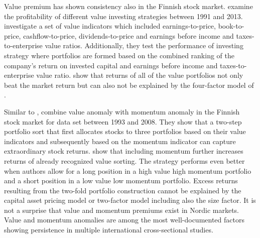 \documentclass[12pt]{article}
\begin{document}
Value premium has shown consistency also in the Finnish stock market. \citet*{Davydov2017MagicFV} examine the profitability of different value investing strategies between 1991 and 2013. \citeauthor{Davydov2017MagicFV} investigate a set of value indicators which included earnings-to-price, book-to-price, cashflow-to-price, dividends-to-price and earnings before income and taxes-to-enterprise value ratios. Additionally, they test the performance of investing strategy where portfolios are formed based on the combined ranking of the company's return on invested capital and earnings before income and taxes-to-enterprise value ratio. \citet{Davydov2017MagicFV} show that returns of all of the value portfolios not only beat the market return but can also not be explained by the four-factor model of \citet{Carhart1997}.\footnotemark {}  \par


Similar to \citet{grobys}, \citet{leivo2011} combine value anomaly with momentum anomaly in the Finnish stock market for data set between 1993 and 2008. They show that a two-step portfolio sort that first allocates stocks to three portfolios based on their value indicators and subsequently based on the momentum indicator can capture extraordinary stock returns. \citeauthor{leivo2011} show that including momentum further increases returns of already recognized value sorting. The strategy performs even better when authors allow for a long position in a high value high momentum portfolio and a short position in a low value low momentum portfolio. Excess returns resulting from the two-fold portfolio construction cannot be explained by the capital asset pricing model or two-factor model including also the size factor.\footnotemark {} It is not a surprise that value and momentum premiums exist in Nordic markets. Value and momentum anomalies are among the most well-documented factors showing persistence in multiple international cross-sectional studies.\footnotemark {} \par
\end{document}
